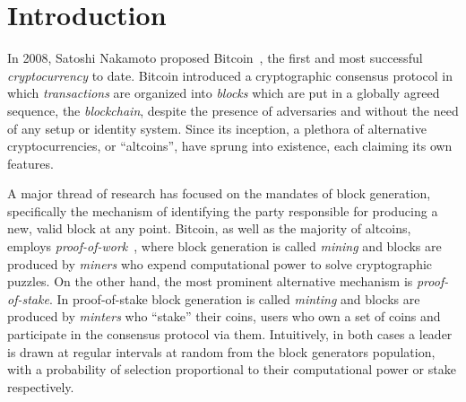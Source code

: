 
\section{Introduction}

In 2008, Satoshi Nakamoto proposed Bitcoin~\cite{bitcoin}, the first and most
successful \emph{cryptocurrency} to date. Bitcoin introduced a cryptographic
consensus protocol in which \emph{transactions} are organized into
\emph{blocks} which are put in a globally agreed sequence, the
\emph{blockchain}, despite the presence of adversaries and without the need of
any setup or identity system. Since its inception, a plethora of alternative
cryptocurrencies, or ``altcoins'', have sprung into existence, each claiming
its own features.

A major thread of research has focused on the mandates of block generation,
specifically the mechanism of identifying the party responsible for producing a
new, valid block at any point. Bitcoin, as well as the majority of altcoins,
employs \emph{proof-of-work}~\cite{C:DwoNao92}, where block generation is
called \emph{mining} and blocks are produced by \emph{miners} who expend
computational power to solve cryptographic puzzles. On the other hand, the most
prominent alternative mechanism is \emph{proof-of-stake}. In proof-of-stake
block generation is called \emph{minting} and blocks are produced by
\emph{minters} who ``stake'' their coins, \ie users who own a set of coins and
participate in the consensus protocol via them. Intuitively, in both cases a
leader is drawn at regular intervals at random from the block generators
population, with a probability of selection proportional to their computational
power or stake respectively.

